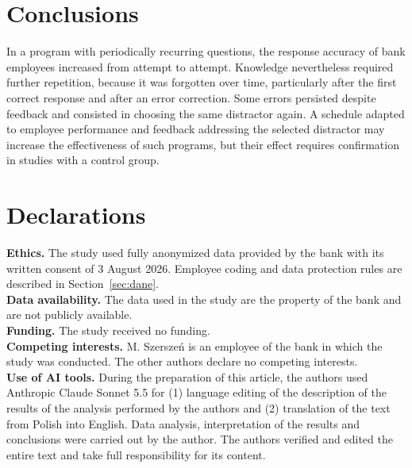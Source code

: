 \documentclass[11pt]{article}
\begin{document}
\section{Conclusions}
In a program with periodically recurring questions, the response accuracy of bank employees increased
from attempt to attempt. Knowledge nevertheless required further repetition, because it was forgotten
over time, particularly after the first correct response and after an error correction. Some errors
persisted despite feedback and consisted in choosing the same distractor again. A schedule adapted to
employee performance and feedback addressing the selected distractor may increase the effectiveness of
such programs, but their effect requires confirmation in studies with a control group.

\section*{Declarations}

\noindent\textbf{Ethics.}
The study used fully anonymized data provided by the bank with its written consent of 3 August 2026.
Employee coding and data protection rules are described in Section~\ref{sec:dane}.\\
\textbf{Data availability.}
The data used in the study are the property of the bank and are not publicly available.\\
\textbf{Funding.}
The study received no funding.\\
\textbf{Competing interests.}
M. Szerszeń is an employee of the bank in which the study was conducted. The other authors declare no
competing interests.\\
\textbf{Use of AI tools.}
During the preparation of this article, the authors used Anthropic Claude Sonnet 5.5 for (1) language
editing of the description of the results of the analysis performed by the authors and (2) translation
of the text from Polish into English. Data analysis, interpretation of the results and conclusions were
carried out by the author. The authors verified and edited the entire text and take full responsibility
for its content.


\end{document}

